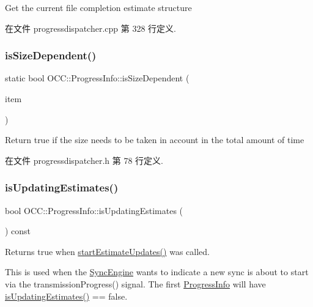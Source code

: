Get the current file completion estimate structure 

在文件 progressdispatcher.\+cpp 第 328 行定义.

\mbox{\label{class_o_c_c_1_1_progress_info_a31bf3330cee102b123b7ad869d46fce1}} 
\subsubsection{\texorpdfstring{is\+Size\+Dependent()}{isSizeDependent()}}
{\footnotesize\ttfamily static bool O\+C\+C\+::\+Progress\+Info\+::is\+Size\+Dependent (\begin{DoxyParamCaption}\item[{const \hyperlink{class_o_c_c_1_1_sync_file_item}{Sync\+File\+Item} \&}]{item }\end{DoxyParamCaption})\hspace{0.3cm}{\ttfamily [static]}}

Return true if the size needs to be taken in account in the total amount of time 

在文件 progressdispatcher.\+h 第 78 行定义.

\mbox{\label{class_o_c_c_1_1_progress_info_adcc9c47a252a15e9866059ea127c0b08}} 
\subsubsection{\texorpdfstring{is\+Updating\+Estimates()}{isUpdatingEstimates()}}
{\footnotesize\ttfamily bool O\+C\+C\+::\+Progress\+Info\+::is\+Updating\+Estimates (\begin{DoxyParamCaption}{ }\end{DoxyParamCaption}) const}

Returns true when \hyperlink{class_o_c_c_1_1_progress_info_a07894c5202d9f21cb23ce308900c8415}{start\+Estimate\+Updates()} was called.

This is used when the \hyperlink{class_o_c_c_1_1_sync_engine}{Sync\+Engine} wants to indicate a new sync is about to start via the transmission\+Progress() signal. The first \hyperlink{class_o_c_c_1_1_progress_info}{Progress\+Info} will have \hyperlink{class_o_c_c_1_1_progress_info_adcc9c47a252a15e9866059ea127c0b08}{is\+Updating\+Estimates()} == false. 

